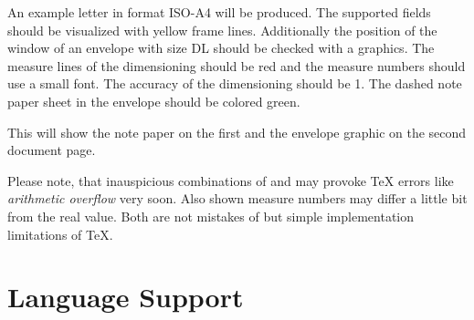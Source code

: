 \begin{Example}
  An example letter in format ISO-A4 will be produced. The supported fields
  should be visualized with yellow frame lines. Additionally the position of
  the window of an envelope with size DL should be checked with a
  graphics. The measure lines of the dimensioning should be red and the
  measure numbers should use a small font. The accuracy of the dimensioning
  should be 1. The dashed note paper sheet in the envelope should be
  colored green.
  This will show the note paper on the first and the envelope graphic on the
  second document page.
\end{Example}

Please note, that inauspicious combinations of  and
 may provoke \TeX{} errors like \emph{arithmetic overflow}
very soon. Also shown measure numbers may differ a little bit from the real
value. Both are not mistakes of  but simple implementation
limitations of \TeX.
%
\EndIndexGroup
%
\EndIndexGroup
%
\EndIndexGroup


\section{Language Support}
%
\BeginIndexGroup
{}%

